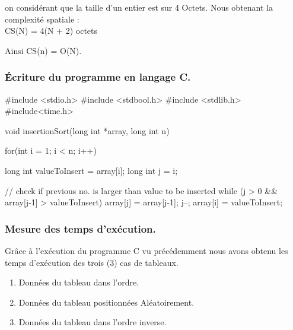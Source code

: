 \documentclass[12pt]{article}
\begin{document}
on considérant que la taille d'un entier est sur 4 Octets.
Nous obtenant la complexité spatiale :\\
\color{blue}
CS(N) = 4(N + 2) octets
\color{black}

Ainsi \color{blue}
CS(n) = O(N).
\color{black}


\subsubsection{Écriture du programme en langage C.}
\begin{sql}
#include <stdio.h>
#include <stdbool.h>
#include <stdlib.h>
#include<time.h>

void insertionSort(long int *array, long int n) {
   for(int i = 1; i < n; i++) { 
    long int valueToInsert = array[i];
    long int j = i;
    
    // check if previous no. is larger than value to be inserted 
    while (j > 0 && array[j-1] > valueToInsert) {
        array[j] = array[j-1];
        j--;
    }
    array[i] = valueToInsert;   
    }
}
\end{sql}

\subsubsection{Mesure des temps d'exécution.}

Grâce à l'exécution du programme C vu précédemment nous avons obtenu les temps d'exécution des trois (3) cas de tableaux.
\begin{enumerate}
	\item Données du tableau dans l'ordre.
	\item Données du tableau positionnées Aléatoirement.
	\item Données du tableau dans l'ordre inverse.
\end{enumerate}
\end{document}
